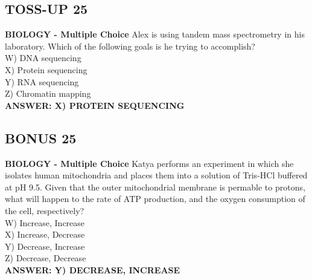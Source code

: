 \documentclass{article}
\begin{document}
\subsection*{TOSS-UP 25}
\textbf{BIOLOGY - Multiple Choice} Alex is using tandem mass spectrometry in his laboratory. Which of the following goals is he trying to accomplish? \\
W) DNA sequencing \\
X) Protein sequencing \\
Y) RNA sequencing \\
Z) Chromatin mapping \\
\textbf{ANSWER: X) PROTEIN SEQUENCING}

\subsection*{BONUS 25}
\textbf{BIOLOGY - Multiple Choice} Katya performs an experiment in which she isolates human mitochondria and places them into a solution of Tris-HCl buffered at pH 9.5. Given that the outer mitochondrial membrane is permable to protons, what will happen to the rate of ATP production, and the oxygen consumption of the cell, respectively? \\
W) Increase, Increase \\
X) Increase, Decrease \\
Y) Decrease, Increase \\
Z) Decrease, Decrease \\
\textbf{ANSWER: Y) DECREASE, INCREASE}
\end{document}
